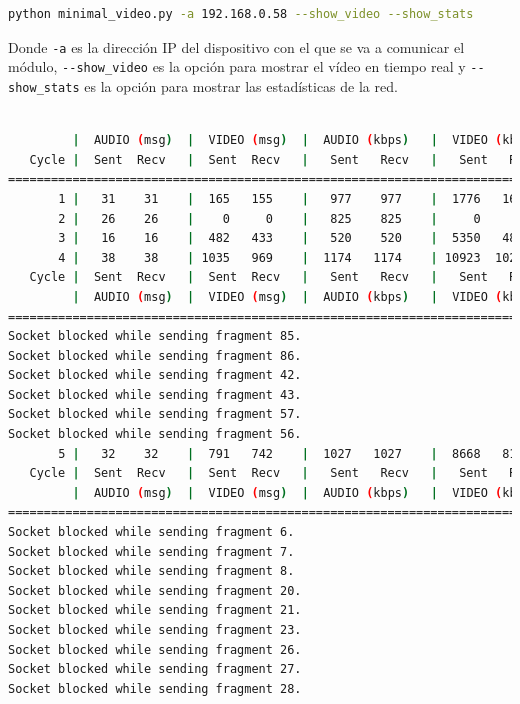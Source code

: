 \begin{lstlisting}[language=bash]
python minimal_video.py -a 192.168.0.58 --show_video --show_stats
\end{lstlisting}
Donde \verb|-a| es la dirección IP del dispositivo con el que se va a comunicar el módulo, \verb|--show_video| es la opción para mostrar el vídeo en tiempo real y \verb|--show_stats| es la opción para mostrar las estadísticas de la red.
\vspace{\baselineskip}

\begin{lstlisting}[language=bash,basicstyle=\ttfamily\tiny]

         |  AUDIO (msg)  |  VIDEO (msg)  |  AUDIO (kbps)   |  VIDEO (kbps)   |     CPU (%) 
   Cycle |  Sent  Recv   |  Sent  Recv   |   Sent   Recv   |   Sent   Recv   | Program System
================================================================================================
       1 |   31    31    |  165   155    |   977    977    |  1776   1670    |  20      0       
       2 |   26    26    |    0     0    |   825    825    |     0      0    |  41     71       
       3 |   16    16    |  482   433    |   520    520    |  5350   4803    |  28     82       
       4 |   38    38    | 1035   969    |  1174   1174    | 10923  10228    |  23     70       
   Cycle |  Sent  Recv   |  Sent  Recv   |   Sent   Recv   |   Sent   Recv   | Program System
         |  AUDIO (msg)  |  VIDEO (msg)  |  AUDIO (kbps)   |  VIDEO (kbps)   |     CPU (%) 
===========================================================================================
Socket blocked while sending fragment 85.
Socket blocked while sending fragment 86.
Socket blocked while sending fragment 42.
Socket blocked while sending fragment 43.
Socket blocked while sending fragment 57.
Socket blocked while sending fragment 56.
       5 |   32    32    |  791   742    |  1027   1027    |  8668   8130    |  37     74       
   Cycle |  Sent  Recv   |  Sent  Recv   |   Sent   Recv   |   Sent   Recv   | Program System
         |  AUDIO (msg)  |  VIDEO (msg)  |  AUDIO (kbps)   |  VIDEO (kbps)   |     CPU (%) 
===========================================================================================
Socket blocked while sending fragment 6.
Socket blocked while sending fragment 7.
Socket blocked while sending fragment 8.
Socket blocked while sending fragment 20.
Socket blocked while sending fragment 21.
Socket blocked while sending fragment 23.
Socket blocked while sending fragment 26.
Socket blocked while sending fragment 27.
Socket blocked while sending fragment 28.

\end{lstlisting}

